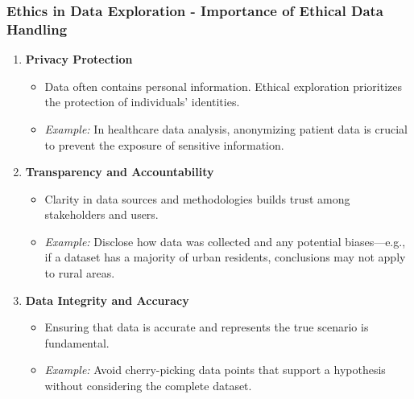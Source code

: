 \documentclass[aspectratio=169]{beamer}
\begin{document}
\begin{frame}[fragile]
    \frametitle{Ethics in Data Exploration - Importance of Ethical Data Handling}
    \begin{enumerate}
        \item \textbf{Privacy Protection}
            \begin{itemize}
                \item Data often contains personal information. Ethical exploration prioritizes the protection of individuals’ identities.
                \item \textit{Example:} In healthcare data analysis, anonymizing patient data is crucial to prevent the exposure of sensitive information.
            \end{itemize}
        
        \item \textbf{Transparency and Accountability}
            \begin{itemize}
                \item Clarity in data sources and methodologies builds trust among stakeholders and users.
                \item \textit{Example:} Disclose how data was collected and any potential biases—e.g., if a dataset has a majority of urban residents, conclusions may not apply to rural areas.
            \end{itemize}
        
        \item \textbf{Data Integrity and Accuracy}
            \begin{itemize}
                \item Ensuring that data is accurate and represents the true scenario is fundamental.
                \item \textit{Example:} Avoid cherry-picking data points that support a hypothesis without considering the complete dataset.
            \end{itemize}
    \end{enumerate}
\end{frame}
\end{document}
